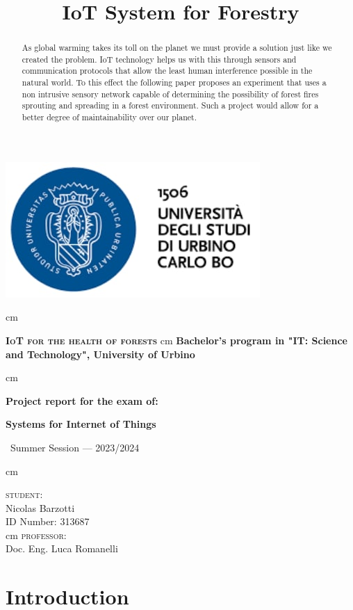 \documentclass[11pt]{article}
\title{IoT System for Forestry}
\begin{document}
\begin{titlepage}
    \centering
    \vspace*{\baselineskip}
    \centerline{\includegraphics{logo uniurb.jpg}}
     cm
    
    \Huge{\textbf{\scshape{IoT for the health of forests}}}
     cm
    \large{\textbf{Bachelor's program in "IT: Science and Technology", University of Urbino}}

     cm
    \centerline{\textbf{Project report for the exam of:}} 
    \centerline{\textbf{Systems for Internet of Things}} 
    \vskip 0.3cm
	\Large{\ Summer Session --- 2023/2024}
	
	     cm
	
		{\large {\scshape student:}\\[0.3cm] Nicolas Barzotti\\ ID Number: 313687}\\ 
		[0.4cm]
         cm
	     \large{{\scshape professor:} \\[0.3cm] Doc. Eng. Luca Romanelli}\\[1.3cm]		
    
    
\end{titlepage}
\raggedright

\begin{abstract}
\noindent As global warming takes its toll on the planet we must provide a solution just like we created the problem. IoT technology helps us with this through sensors and communication protocols that allow the least human interference possible in the natural world. To this effect the following paper proposes an experiment that uses a non intrusive sensory network capable of determining the possibility of forest fires sprouting and spreading in a forest environment. Such a project would allow for a better degree of maintainability over our planet.
\end{abstract}
\tableofcontents 
\newpage

\section{Introduction}
\end{document}
